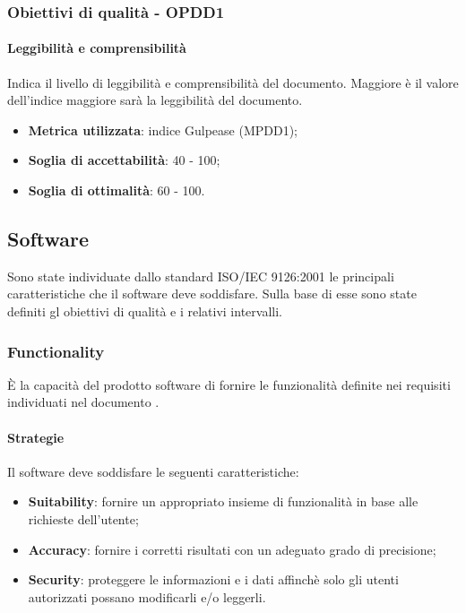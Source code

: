\documentclass[PdQ.tex]{subfiles}
\begin{document}
		\subsubsection{Obiettivi di qualità - OPDD1}
			\paragraph{Leggibilità e comprensibilità}
			Indica il livello di leggibilità e comprensibilità del documento. Maggiore è il valore dell'indice maggiore sarà la leggibilità del documento.
			\begin{itemize}
				\item \textbf{Metrica utilizzata}: indice Gulpease (MPDD1);
				\item \textbf{Soglia di accettabilità}: 40 - 100;
				\item \textbf{Soglia di ottimalità}: 60 - 100.
			\end{itemize}
					
	\subsection{Software}
		Sono state individuate dallo standard ISO/IEC 9126:2001 le principali caratteristiche che il software deve soddisfare.
		Sulla base di esse sono state definiti gl obiettivi di qualità e i relativi intervalli.
		
		\subsubsection{Functionality}
		È la capacità del prodotto software di fornire le funzionalità definite nei requisiti individuati nel documento \ARdocRP{}.
		
			\paragraph{Strategie}
			Il software deve soddisfare le seguenti caratteristiche:
			\begin{itemize}
				\item \textbf{Suitability}: fornire un appropriato insieme di funzionalità in base alle richieste dell'utente;
				\item \textbf{Accuracy}: fornire i corretti risultati con un adeguato grado di precisione;
				\item \textbf{Security}: proteggere le informazioni e i dati affinchè solo gli utenti autorizzati possano modificarli e/o leggerli.
			\end{itemize}
			
\end{document}
